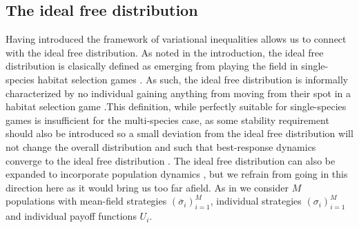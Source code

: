 \subsection{The ideal free distribution}
Having introduced the framework of variational inequalities allows us to connect with the ideal free distribution. As noted in the introduction, the ideal free distribution is clasically defined as emerging from playing the field in single-species habitat selection games \citep{fretwell1969territorial}. As such, the ideal free distribution is informally characterized by no individual gaining anything from moving from their spot in a habitat selection game .This definition, while perfectly suitable for single-species games is insufficient for the multi-species case, as some stability requirement should also be introduced so a small deviation from the ideal free distribution will not change the overall distribution and such that best-response dynamics converge to the ideal free distribution \citep{kvrivan2008ideal}. The ideal free distribution can also be expanded to incorporate population dynamics \citep{cressman2010ideal}, but we refrain from going in this direction here as it would bring us too far afield. As in  we consider $M$ populations with mean-field strategies $(\overbar{\sigma}_i)_{i=1}^M$, individual strategies $(\sigma_i)_{i=1}^M$ and individual payoff functions $U_i$.


